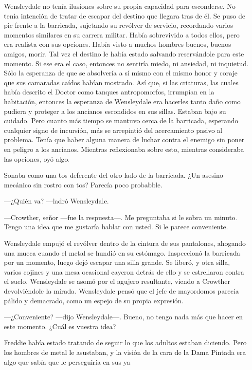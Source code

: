 {Wensleydale no tenía ilusiones sobre su propia capacidad para
	esconderse. No tenía intención de tratar de escapar del destino que
	llegara tras de él. Se puso de pie frente a la barricada, sujetando su
	revólver de servicio, recordando varios momentos similares en su carrera
	militar. Había sobrevivido a todos ellos, pero era realista con sus
	opciones. Había visto a muchos hombres buenos, buenos amigos, morir. Tal
	vez el destino le había estado salvando reservándole para este momento.
	Si ese era el caso, entonces no sentiría miedo, ni ansiedad, ni
	inquietud. Sólo la esperanza de que se absolvería a sí mismo con el
	mismo honor y coraje que sus camaradas caídos habían mostrado. Así que,
	si las criaturas, las cuales había descrito el Doctor como tanques
	antropomorfos, irrumpían en la habitación, entonces la esperanza de
	Wensleydale era hacerles tanto daño como pudiera y proteger a los
	ancianos escondidos en sus sillas. Estaban bajo su cuidado. Pero cuanto
	más tiempo se mantuvo cerca de la barricada, esperando cualquier signo
	de incursión, más se arrepintió del acercamiento pasivo al problema.
	Tenía que haber alguna manera de luchar contra el enemigo sin poner en
	peligro a los ancianos. Mientras reflexionaba sobre esto, mientras
consideraba las opciones, oyó algo.}

{Sonaba como una tos deferente del otro lado de la barricada. ¿Un
asesino mecánico sin rostro con tos? Parecía poco probabble.}

{---¿Quién va? ---ladró Wensleydale.}

{---Crowther, señor ---fue la respuesta---. Me preguntaba si le sobra un
	minuto. Tengo una idea que me gustaría hablar con usted. Si le parece
conveniente.}

{Wensleydale empujó el revólver dentro de la cintura de sus pantalones,
	ahogando una mueca cuando el metal se hundió en su estómago. Inspeccionó
	la barricada por un momento, luego dejó escapar una silla grande. Se
	liberó, y otra silla, varios cojines y una mesa ocasional cayeron detrás
	de ello y se estrellaron contra el suelo. Wensleydale se asomó por el
	agujero resultante, viendo a Crowther devolviéndole la mirada.
	Wensleydale pensó que el jefe de mayordomos parecía pálido y demacrado,
como un espejo de su propia expresión.}

{---¿Conveniente? ---dijo Wensleydale---. Bueno, no tengo nada más que
hacer en este momento. ¿Cuál es vuestra idea?}

\mbox{}

{Freddie había estado tratando de seguir lo que los adultos estaban
	diciendo. Pero los hombres de metal le asustaban, y la visión de la cara
de la Dama Pintada era algo que sabía que le perseguiría en sus ya}

